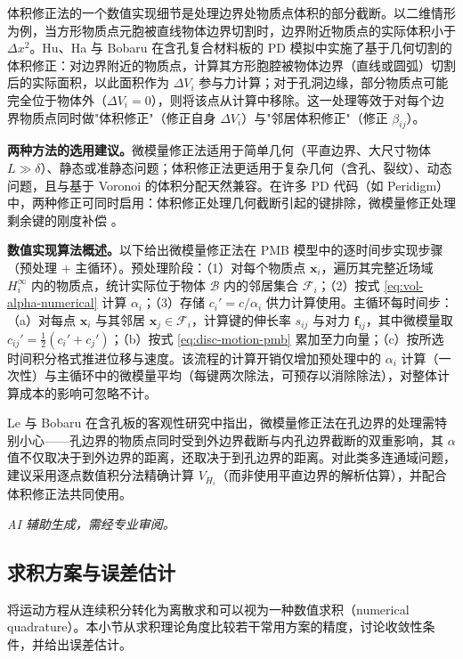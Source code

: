 体积修正法的一个数值实现细节是处理边界处物质点体积的部分截断。以二维情形为例，当方形物质点元胞被直线物体边界切割时，边界附近物质点的实际体积小于 $\Delta x^2$。Hu、Ha 与 Bobaru \cite{HuHaBobaru2012} 在含孔复合材料板的 PD 模拟中实施了基于几何切割的体积修正：对边界附近的物质点，计算其方形胞腔被物体边界（直线或圆弧）切割后的实际面积，以此面积作为 $\Delta V_i$ 参与力计算；对于孔洞边缘，部分物质点可能完全位于物体外（$\Delta V_i=0$），则将该点从计算中移除。这一处理等效于对每个边界物质点同时做"体积修正"（修正自身 $\Delta V_i$）与"邻居体积修正"（修正 $\beta_{ij}$）。

\textbf{两种方法的选用建议。}微模量修正法适用于简单几何（平直边界、大尺寸物体 $L\gg\delta$）、静态或准静态问题；体积修正法更适用于复杂几何（含孔、裂纹）、动态问题，且与基于 Voronoi 的体积分配天然兼容。在许多 PD 代码（如 Peridigm）中，两种修正可同时启用：体积修正处理几何截断引起的键排除，微模量修正处理剩余键的刚度补偿 \cite{Parks2008,MadenciOterkus2014}。

\textbf{数值实现算法概述。}以下给出微模量修正法在 PMB 模型中的逐时间步实现步骤（预处理 + 主循环）。预处理阶段：（1）对每个物质点 $\mathbf{x}_i$，遍历其完整近场域 $H_i^{\infty}$ 内的物质点，统计实际位于物体 $\mathcal{B}$ 内的邻居集合 $\mathcal{F}_i$；（2）按式 \eqref{eq:vol-alpha-numerical} 计算 $\alpha_i$；（3）存储 $c_i'=c/\alpha_i$ 供力计算使用。主循环每时间步：（a）对每点 $\mathbf{x}_i$ 与其邻居 $\mathbf{x}_j\in\mathcal{F}_i$，计算键的伸长率 $s_{ij}$ 与对力 $\mathbf{f}_{ij}$，其中微模量取 $c_{ij}'=\frac{1}{2}(c_i'+c_j')$；（b）按式 \eqref{eq:disc-motion-pmb} 累加至力向量；（c）按所选时间积分格式推进位移与速度。该流程的计算开销仅增加预处理中的 $\alpha_i$ 计算（一次性）与主循环中的微模量平均（每键两次除法，可预存以消除除法），对整体计算成本的影响可忽略不计。

Le 与 Bobaru \cite{LeBobaru2018Obj} 在含孔板的客观性研究中指出，微模量修正法在孔边界的处理需特别小心——孔边界的物质点同时受到外边界截断与内孔边界截断的双重影响，其 $\alpha$ 值不仅取决于到外边界的距离，还取决于到孔边界的距离。对此类多连通域问题，建议采用逐点数值积分法精确计算 $V_{H_i}$（而非使用平直边界的解析估算），并配合体积修正法共同使用。

\emph{AI 辅助生成，需经专业审阅。}

\subsection{求积方案与误差估计}\label{sec:disc-quadrature-schemes}

将运动方程从连续积分转化为离散求和可以视为一种数值求积（numerical quadrature）。本小节从求积理论角度比较若干常用方案的精度，讨论收敛性条件，并给出误差估计。

